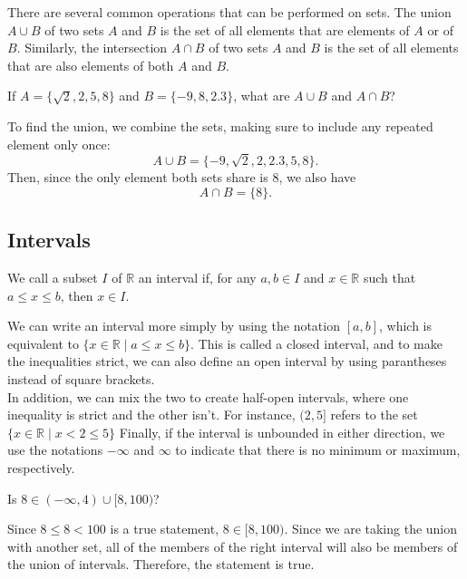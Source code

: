 \noindent
There are several common operations that can be performed on sets.
The union $A \cup B$ of two sets $A$ and $B$ is the set of all elements that are elements of $A$ or of $B$. 
Similarly, the intersection $A \cap B$ of two sets $A$ and $B$ is the set of all elements that are also elements of both $A$ and $B$.
\begin{example}
	If $A = \{\sqrt{2}, 2, 5, 8\}$ and $B = \{-9, 8, 2.3\}$, what are $A \cup B$ and $A \cap B$?		
\end{example}
To find the union, we combine the sets, making sure to include any repeated element only once:
\begin{equation*}
	A \cup B = \{-9, \sqrt{2}, 2, 2.3, 5, 8\}.
\end{equation*}
Then, since the only element both sets share is 8, we also have
\begin{equation*}
	A \cap B = \{8\}.
\end{equation*}

\subsection{Intervals}
\begin{definition}
	We call a subset $I$ of $\mathbb{R}$ an interval if, for any $a, b \in I$ and $x \in \mathbb{R}$ such that $a \leq x \leq b$, then $x \in I$. 
\end{definition}
We can write an interval more simply by using the notation $[a, b]$, which is equivalent to $\{x \in \mathbb{R} \mid a \leq x \leq b\}$. 
This is called a closed interval, and to make the inequalities strict, we can also define an open interval by using parantheses instead of square brackets.\\


\noindent
In addition, we can mix the two to create half-open intervals, where one inequality is strict and the other isn't. 
For instance, $(2, 5]$ refers to the set $\{x \in \mathbb{R} \mid x < 2 \leq 5\}$
Finally, if the interval is unbounded in either direction, we use the notations $-\infty$ and $\infty$ to indicate that there is no minimum or maximum, respectively.

\begin{example}
	Is $8 \in (-\infty, 4) \cup [8, 100)$?
\end{example}
\begin{answer}
	Since $8 \leq 8 < 100$ is a true statement, $8 \in [8, 100)$. 
	Since we are taking the union with another set, all of the members of the right interval will also be members of the union of intervals. 
	Therefore, the statement is true.
\end{answer}